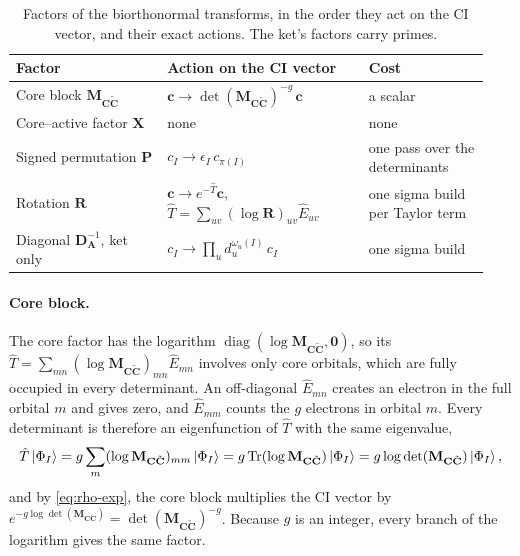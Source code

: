 \documentclass[aip,jcp,preprint]{revtex4-1}
\newcommand{\bvec}[1]{\mathbf{#1}}
\newcommand{\diag}{\operatorname{diag}}
\begin{document}
\begin{table}[h]
\caption{Factors of the biorthonormal transforms, in the order they act on the CI vector, and their exact actions.
The ket's factors carry primes.}
\label{tab:factors}
\begin{tabular}{@{}p{0.30\linewidth}p{0.40\linewidth}>{\raggedright\arraybackslash}p{0.24\linewidth}@{}}
\hline
Factor & Action on the CI vector & Cost \\
\hline
Core block $\bvec{M}_{\bvec{C}\tilde{\bvec{C}}}$
 & $\bvec{c} \to \det(\bvec{M}_{\bvec{C}\tilde{\bvec{C}}})^{-g}\,\bvec{c}$
 & a scalar \\
Core--active factor $\bvec{X}$ & none & none \\
Signed permutation $\bvec{P}$ & $c_I \to \epsilon_I\, c_{\pi(I)}$
 & one pass over the determinants \\
Rotation $\bvec{R}$ & $\bvec{c} \to e^{-\hat{T}}\bvec{c}$,
 $\hat{T} = \sum_{uv}(\log\bvec{R})_{uv}\hat{E}_{uv}$
 & one sigma build per Taylor term \\
Diagonal $\bvec{D}_{\bvec{A}}^{-1}$, ket only
 & $c_I \to \prod_u d_u^{\omega_u(I)}\, c_I$
 & one sigma build \\
\hline
\end{tabular}
\end{table}

\paragraph{Core block.}
The core factor has the logarithm $\diag(\log\bvec{M}_{\bvec{C}\tilde{\bvec{C}}}, \bvec{0})$, so its $\hat{T} = \sum_{mn} (\log\bvec{M}_{\bvec{C}\tilde{\bvec{C}}})_{mn}\hat{E}_{mn}$ involves only core orbitals, which are fully occupied in every determinant.
An off-diagonal $\hat{E}_{mn}$ creates an electron in the full orbital $m$ and gives zero, and $\hat{E}_{mm}$ counts the $g$ electrons in orbital $m$.
Every determinant is therefore an eigenfunction of $\hat{T}$ with the same eigenvalue,
\begin{equation}
 \hat{T}\ket{\Phi_I}
 = g\sum_m (\log\bvec{M}_{\bvec{C}\tilde{\bvec{C}}})_{mm}\ket{\Phi_I}
 = g\,\mathrm{Tr}(\log\bvec{M}_{\bvec{C}\tilde{\bvec{C}}})\ket{\Phi_I}
 = g\log\det(\bvec{M}_{\bvec{C}\tilde{\bvec{C}}})\ket{\Phi_I},
\end{equation}
and by \cref{eq:rho-exp}, the core block multiplies the CI vector by $e^{-g\log\det(\bvec{M}_{\bvec{C}\tilde{\bvec{C}}})} = \det(\bvec{M}_{\bvec{C}\tilde{\bvec{C}}})^{-g}$.
Because $g$ is an integer, every branch of the logarithm gives the same factor.
\end{document}
